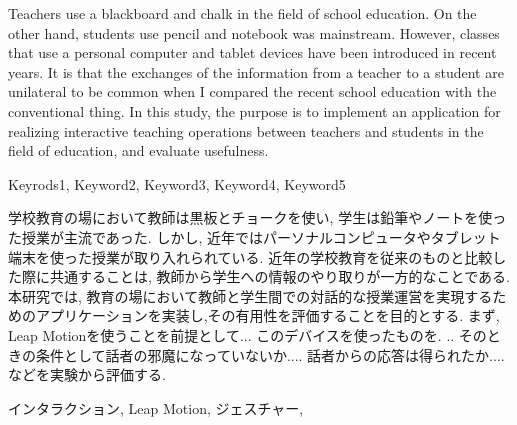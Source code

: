 \documentclass{funthesis}
\begin{document}
\maketitle       %

\begin{eabstract}
Teachers use a blackboard and chalk in the field of school education. On the other hand, students use pencil and notebook was mainstream. However, classes that use a personal computer and tablet devices have been introduced in recent years. It is that the exchanges of the information from a teacher to a student are unilateral to be common when I compared the recent school education with the conventional thing. In this study, the purpose is to implement an application for realizing interactive teaching operations between teachers and students in the field of education, and evaluate usefulness.
\end{eabstract}

\begin{ekeyword}
Keyrods1, Keyword2, Keyword3, Keyword4, Keyword5
\end{ekeyword}

\begin{jabstract}
学校教育の場において教師は黒板とチョークを使い, 学生は鉛筆やノートを使った授業が主流であった. しかし, 近年ではパーソナルコンピュータやタブレット端末を使った授業が取り入れられている. 近年の学校教育を従来のものと比較した際に共通することは, 教師から学生への情報のやり取りが一方的なことである. 本研究では, 教育の場において教師と学生間での対話的な授業運営を実現するためのアプリケーションを実装し,その有用性を評価することを目的とする. まず, Leap Motionを使うことを前提として...   このデバイスを使ったものを. .. 
そのときの条件として話者の邪魔になっていないか....
話者からの応答は得られたか....
などを実験から評価する. 


\end{jabstract}

\begin{jkeyword}
インタラクション, Leap Motion, ジェスチャー, 
\end{jkeyword}

\tableofcontents %
\end{document}
